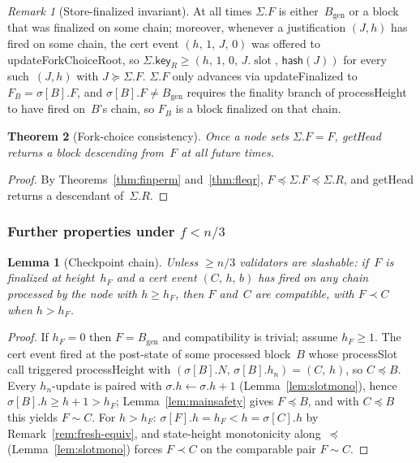 \documentclass{article}
\newcommand{\genesis}{\ensuremath{B_{\mathrm{gen}}}}
\newcommand{\slot}[0]{\ensuremath{\operatorname{\mathrm{slot}}}}
\newcommand{\hash}{\mathsf{hash}}
\newcommand{\key}{\mathsf{key}}
\newcommand{\processSlot}{\textsf{processSlot}\xspace}
\newcommand{\processHeight}{\textsf{processHeight}\xspace}
\newcommand{\updateForkChoiceRoot}{\textsf{updateForkChoiceRoot}\xspace}
\newcommand{\updateFinalized}{\textsf{updateFinalized}\xspace}
\newcommand{\getHead}{\textsf{getHead}\xspace}
\theoremstyle{plain}
\newtheorem{theorem}{Theorem}
\newtheorem{lemma}{Lemma}
\theoremstyle{definition}
\theoremstyle{remark}
\newtheorem{remark}[theorem]{Remark}
\begin{document}
\begin{remark}[Store-finalized invariant]\label{rem:fs-invariant}
At all times $\Sigma.F$ is either~$\genesis$ or a block that was finalized on some chain; moreover, whenever a justification $(J, h)$ has fired on some chain, the cert event $(h,\, 1,\, J,\, 0)$ was offered to \updateForkChoiceRoot, so $\Sigma.\key_R \geq (h,\, 1,\, 0,\, J.\slot,\, \hash(J))$ for every such~$(J, h)$ with $J \succeq \Sigma.F$.
$\Sigma.F$ only advances via \updateFinalized to $F_B = \sigma[B].F$, and $\sigma[B].F \neq \genesis$ requires the finality branch of \processHeight to have fired on~$B$'s chain, so $F_B$ is a block finalized on that chain.
\end{remark}

\begin{theorem}[Fork-choice consistency]\label{thm:fcconsistency}
Once a node sets $\Sigma.F = F$, \getHead returns a block descending from~$F$ at all future times.
\end{theorem}

\begin{proof}
By Theorems~\ref{thm:finperm} and~\ref{thm:fleqr}, $F \preceq \Sigma.F \preceq \Sigma.R$, and \getHead returns a descendant of~$\Sigma.R$.
\end{proof}

\subsubsection*{Further properties under $f < n/3$}

\begin{lemma}[Checkpoint chain]\label{lem:certchain}
Unless $\geq n/3$ validators are slashable: if~$F$ is finalized at height~$h_F$ and a cert event $(C,\, h,\, b)$ has fired on any chain processed by the node with $h \geq h_F$, then $F$ and~$C$ are compatible, with $F \prec C$ when $h > h_F$.
\end{lemma}

\begin{proof}
If $h_F = 0$ then $F = \genesis$ and compatibility is trivial; assume $h_F \geq 1$.
The cert event fired at the post-state of some processed block~$B$ whose \processSlot call triggered \processHeight with $(\sigma[B].N,\, \sigma[B].h_n) = (C,\, h)$, so $C \preceq B$.
Every $h_n$-update is paired with $\sigma.h \gets \sigma.h + 1$ (Lemma~\ref{lem:slotmono}), hence $\sigma[B].h \geq h + 1 > h_F$; Lemma~\ref{lem:mainsafety} gives $F \preceq B$, and with $C \preceq B$ this yields $F \sim C$.
For $h > h_F$: $\sigma[F].h = h_F < h = \sigma[C].h$ by Remark~\ref{rem:fresh-equiv}, and state-height monotonicity along~$\preceq$ (Lemma~\ref{lem:slotmono}) forces $F \prec C$ on the comparable pair $F \sim C$.
\end{proof}
\end{document}
